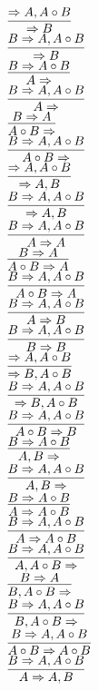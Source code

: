 \documentclass[11pt]{article}
\begin{document}
\begin{center}

$\infer{\Rightarrow B}{\Rightarrow A, A\circ B}$
\bigskip
\\$\infer{\Rightarrow B}{B\Rightarrow A, A\circ B}$
\bigskip
\\$\infer{A\Rightarrow }{B\Rightarrow A\circ B}$
\bigskip
\\$\infer{A\Rightarrow }{B\Rightarrow A, A\circ B}$
\bigskip
\\$\infer{A\circ B\Rightarrow }{B\Rightarrow A}$
\bigskip
\\$\infer{A\circ B\Rightarrow }{B\Rightarrow A, A\circ B}$
\bigskip
\\$\infer{\Rightarrow A, B}{\Rightarrow A, A\circ B}$
\bigskip
\\$\infer{\Rightarrow A, B}{B\Rightarrow A, A\circ B}$
\bigskip
\\$\infer{A\Rightarrow A}{B\Rightarrow A, A\circ B}$
\bigskip
\\$\infer{A\circ B\Rightarrow A}{B\Rightarrow A}$
\bigskip
\\$\infer{A\circ B\Rightarrow A}{B\Rightarrow A, A\circ B}$
\bigskip
\\$\infer{A\Rightarrow B}{B\Rightarrow A, A\circ B}$
\bigskip
\\$\infer{B\Rightarrow B}{B\Rightarrow A, A\circ B}$
\bigskip
\\$\infer{\Rightarrow B, A\circ B}{\Rightarrow A, A\circ B}$
\bigskip
\\$\infer{\Rightarrow B, A\circ B}{B\Rightarrow A, A\circ B}$
\bigskip
\\$\infer{A\circ B\Rightarrow B}{B\Rightarrow A, A\circ B}$
\bigskip
\\$\infer{A, B\Rightarrow }{B\Rightarrow A\circ B}$
\bigskip
\\$\infer{A, B\Rightarrow }{B\Rightarrow A, A\circ B}$
\bigskip
\\$\infer{A\Rightarrow A\circ B}{B\Rightarrow A\circ B}$
\bigskip
\\$\infer{A\Rightarrow A\circ B}{B\Rightarrow A, A\circ B}$
\bigskip
\\$\infer{A, A\circ B\Rightarrow }{B\Rightarrow A, A\circ B}$
\bigskip
\\$\infer{B, A\circ B\Rightarrow }{B\Rightarrow A}$
\bigskip
\\$\infer{B, A\circ B\Rightarrow }{B\Rightarrow A, A\circ B}$
\bigskip
\\$\infer{A\circ B\Rightarrow A\circ B}{B\Rightarrow A, A\circ B}$
\bigskip
\\$\infer{A\Rightarrow A, B}{B\Rightarrow A, A\circ B}$

\end{center}
\end{document}

